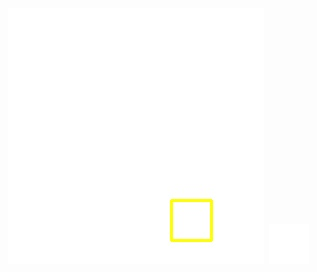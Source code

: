 \documentclass[10pt,UTF8,fntef]{ctexart}
\begin{document}
\begin{figure}[H]
{{\begin{minipage}[b]{0.15\linewidth}
            \includegraphics[width=1\linewidth]{../log/spoon3/cut/LC81321192014054LGN00_03249_qa.jpg}\vspace{4pt}
            \includegraphics[width=1\linewidth]{../log/spoon3/cut/tmp_cut_LC81321192014054LGN00_03249_qa.jpg}\vspace{4pt}

\end{minipage}}}
\end{figure}
\end{document}
